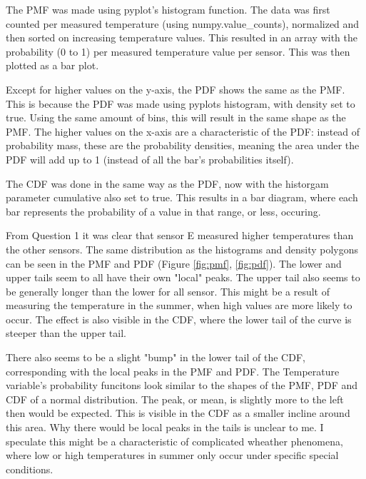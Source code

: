 \documentclass{report}
\begin{document}
	 The PMF was made using pyplot's histogram function. The data was first counted per measured temperature (using numpy.value\_counts), normalized and then sorted on increasing temperature values. This resulted in an array with the probability (0 to 1) per measured temperature value per sensor. This was then plotted as a bar plot.
	
	Except for higher values on the y-axis, the PDF shows the same as the PMF. This is because the PDF was made using pyplots histogram, with density set to true. Using the same amount of bins, this will result in the same shape as the PMF. The higher values on the x-axis are a characteristic of the PDF: instead of probability mass, these are the probability densities, meaning the area under the PDF will add up to 1 (instead of all the bar's probabilities itself).
	
	The CDF was done in the same way as the PDF, now with the historgam parameter cumulative also set to true. This results in a bar diagram, where each bar represents the probability of a value in that range, or less, occuring.
	
	From Question 1 it was clear that sensor E measured higher temperatures than the other sensors. The same distribution as the histograms and density polygons can be seen in the PMF and PDF (Figure \ref{fig:pmf}, \ref{fig:pdf}). The lower and upper tails seem to all have their own "local" peaks. The upper tail also seems to be generally longer than the lower for all sensor. This might be a result of measuring the temperature in the summer, when high values are more likely to occur. The effect is also visible in the CDF, where the lower tail of the curve is steeper than the upper tail. 
	
	\newpage
	There also seems to be a slight "bump" in the lower tail of the CDF, corresponding with the local peaks in the PMF and PDF. The Temperature variable's probability funcitons look similar to the shapes of the PMF, PDF and CDF of a normal distribution. The peak, or mean, is slightly more to the left then would be expected. This is visible in the CDF as a smaller incline around this area. Why there would be local peaks in the tails is unclear to me. I speculate this might be a characteristic of complicated wheather phenomena, where low or high temperatures in summer only occur under specific special conditions.
	
\end{document}
